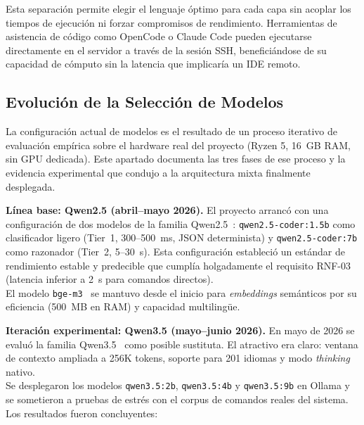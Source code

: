 Esta separación permite elegir el lenguaje óptimo para cada capa sin acoplar los tiempos de ejecución ni forzar compromisos de rendimiento. Herramientas de asistencia de código como OpenCode o Claude Code pueden ejecutarse directamente en el servidor a través de la sesión SSH, beneficiándose de su capacidad de cómputo sin la latencia que implicaría un IDE remoto.

\subsection{Evolución de la Selección de Modelos}
\label{sec:migracion_qwen}

La configuración actual de modelos es el resultado de un proceso iterativo de evaluación empírica sobre el hardware real del proyecto (Ryzen 5, 16~GB RAM, sin GPU dedicada). Este apartado documenta las tres fases de ese proceso y la evidencia experimental que condujo a la arquitectura mixta finalmente desplegada.

\textbf{Línea base: Qwen2.5 (abril--mayo 2026).} El proyecto arrancó con una configuración de dos modelos de la familia Qwen2.5~\cite{hui_qwen25_coder_2024}: \texttt{qwen2.5-coder:1.5b} como clasificador ligero (Tier~1, 300--500~ms, JSON determinista) y \texttt{qwen2.5-coder:7b} como razonador (Tier~2, 5--30~s). Esta configuración estableció un estándar de rendimiento estable y predecible que cumplía holgadamente el requisito RNF-03 (latencia inferior a 2~s para comandos directos).\\[2pt]
El modelo \texttt{bge-m3}~\cite{bge_m3} se mantuvo desde el inicio para \textit{embeddings} semánticos por su eficiencia (500~MB en RAM) y capacidad multilingüe.

\textbf{Iteración experimental: Qwen3.5 (mayo--junio 2026).} En mayo de 2026 se evaluó la familia Qwen3.5~\cite{qwen3_5} como posible sustituta. El atractivo era claro: ventana de contexto ampliada a 256K tokens, soporte para 201 idiomas y modo \textit{thinking} nativo.\\[2pt]
Se desplegaron los modelos \texttt{qwen3.5:2b}, \texttt{qwen3.5:4b} y \texttt{qwen3.5:9b} en Ollama y se sometieron a pruebas de estrés con el corpus de comandos reales del sistema. Los resultados fueron concluyentes:

